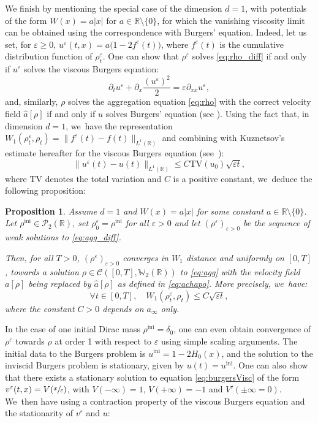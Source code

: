 \documentclass[JEP,XML,SOM,Unicode, NoFloatCountersInSection,published]{cedram}
\newcommand{\ini}{\mathrm{ini}}
\def\RR{\mathbb{R}}
\def\WW{\mathbb{W}}
\def\eps{\varepsilon}
\def\pa{\partial}
\def\calC{{\mathcal C}}
\def\calP{{\mathcal P}}
\def\achapo{\widehat{a}}
\theoremstyle{plain}
\newtheorem{prop}[theorem]{Proposition}
\theoremstyle{definition}
\begin{document}
We finish by mentioning the special case of the dimension $d = 1$, with potentials of the form $W(x) = a|x|$ for $a\in\RR \setminus \{0\}$, for which the vanishing viscosity limit can be obtained using the correspondence with Burgers' equation. Indeed, let us set, for $\eps \geq 0$, $u^\eps(t,x) = a\big(1 - 2 f^\eps(t)\big)$, where $f^\eps(t)$ is the cumulative distribution function of $\rho^\eps_t$. One can show that $\rho^\eps$ solves \eqref{eq:rho_diff} if and only if $u^\eps$ solves the viscous Burgers equation:
\begin{equation}\label{eq:burgersVisc}
\pa_t u^\eps + \pa_x \frac{(u^\eps)^2}{2} = \eps \pa_{xx} u^\eps,
\end{equation}
and, similarly, $\rho$ solves the aggregation equation \eqref{eq:rho} with the correct velocity field $\achapo[\rho]$ if and only if $u$ solves Burgers' equation (see \cite{bonaschi13, relax21, jv15}). Using the fact that, in dimension $d=1$, we~have the representation $W_1(\rho^\eps_t, \rho_t) = \|f^\eps(t) - f(t)\|_{L^1(\RR)}$ and combining with Kuznetsov's estimate hereafter for the viscous Burgers equation (see~\cite{kuznetsov76}):
\[
\|u^\eps(t) - u(t)\|_{L^1(\RR)} \leq C \mathrm{TV}(u_0) \sqrt{\eps t},
\]
where $\mathrm{TV}$ denotes the total variation and $C$ is a positive constant, we~deduce the following proposition:
\begin{prop}\label{prop:cvViaBurgers}
Assume $d=1$ and $W(x) = a|x|$ for some constant $a\in \RR \setminus \{0\}$. Let $\rho^{\ini} \in \calP_2(\RR)$, set $\rho_0^\eps = \rho^{\ini}$ for all $\eps>0$ and let $(\rho^\eps)_{\eps > 0}$ be the sequence of weak solutions to \eqref{eq:agg_diff}.

Then, for all $T>0$, $(\rho^\eps)_{\eps > 0}$ converges in $W_1$ distance and uniformly on $[0,T]$, towards a solution $\rho \in \calC([0,T], \WW _2(\RR))$ to \eqref{eq:agg} with the velocity field $a[\rho]$ being replaced by $\achapo[\rho]$ as defined in \eqref{eq:achapo}. More precisely, we~have:
\[
\forall t \in [0,T], \quad W_1(\rho_t^\eps, \rho_t) \leq C \sqrt{\eps t},
\]
where the constant $C>0$ depends on $a_\infty$ only.
\end{prop}
In the case of one initial Dirac mass $\rho^{\ini} = \delta_0$, one can even obtain convergence of $\rho^\eps$ towards $\rho$ at order 1 with respect to $\eps$ using simple scaling arguments. The initial data to the Burgers problem is $u^{\ini} = 1 - 2H_0(x)$, and the solution to the inviscid Burgers problem is stationary, given by $u(t) = u^{\ini}$. One can also show that there exists a stationary solution to equation \eqref{eq:burgersVisc} of the form $v^\eps(t,x) = V(\sfrac{x}{\eps})$, with $V(-\infty) = 1$, $V(+\infty) = -1$ and $V'(\pm\infty = 0)$. We~then have using a contraction property of the viscous Burgers equation and the stationarity of $v^\eps$ and $u$:
\end{document}
